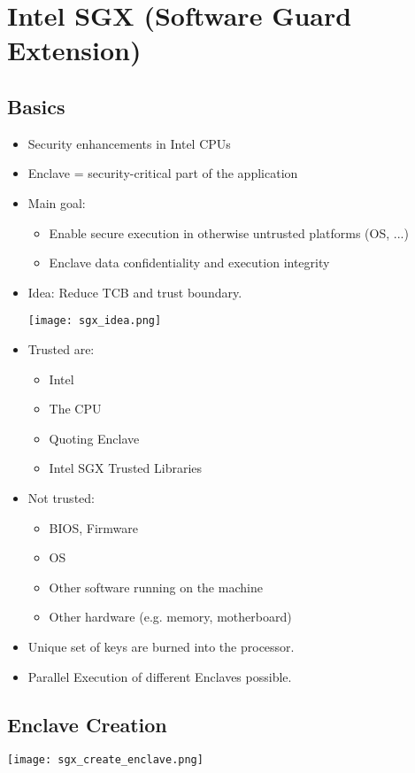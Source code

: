 
\section{Intel SGX (Software Guard Extension)}
\subsection{Basics}
\begin{itemize}
  \item Security enhancements in Intel CPUs
  \item Enclave = security-critical part of the application
  \item Main goal:
    \begin{itemize}
      \item Enable secure execution in otherwise untrusted platforms (OS, ...)
      \item Enclave data confidentiality and execution integrity
    \end{itemize}
  \item Idea: Reduce TCB and trust boundary.
    \begin{center}
      \texttt{[image: sgx\_idea.png]}
    \end{center}
  \item Trusted are:
    \begin{itemize}
      \item Intel
      \item The CPU
      \item Quoting Enclave
      \item Intel SGX Trusted Libraries
    \end{itemize}
  \item Not trusted:
    \begin{itemize}
      \item BIOS, Firmware
      \item OS
      \item Other software running on the machine
      \item Other hardware (e.g. memory, motherboard)
    \end{itemize}
  \item Unique set of keys are burned into the processor.
  \item Parallel Execution of different Enclaves possible.
\end{itemize}

\subsection{Enclave Creation}
\begin{center}
  \texttt{[image: sgx\_create\_enclave.png]}
\end{center}

